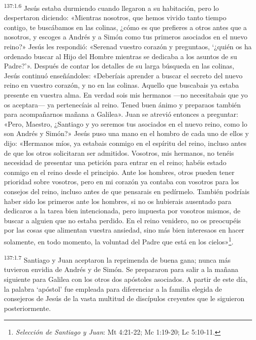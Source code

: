 \par
\textsuperscript{137:1.6} Jesús estaba durmiendo cuando llegaron a su habitación, pero lo despertaron diciendo: «Mientras nosotros, que hemos vivido tanto tiempo contigo, te buscábamos en las colinas, ¿cómo es que prefieres a otros antes que a nosotros, y escoges a Andrés y a Simón como tus primeros asociados en el nuevo reino?» Jesús les respondió: «Serenad vuestro corazón y preguntaos, `¿quién os ha ordenado buscar al Hijo del Hombre mientras se dedicaba a los asuntos de su Padre?'». Después de contar los detalles de su larga búsqueda en las colinas, Jesús continuó enseñándoles: «Deberíais aprender a buscar el secreto del nuevo reino en vuestro corazón, y no en las colinas. Aquello que buscabais ya estaba presente en vuestra alma. En verdad sois mis hermanos ---no necesitabais que yo os aceptara--- ya pertenecíais al reino. Tened buen ánimo y preparaos también para acompañarnos mañana a Galilea». Juan se atrevió entonces a preguntar: «Pero, Maestro, ¿Santiago y yo seremos tus asociados en el nuevo reino, como lo son Andrés y Simón?» Jesús puso una mano en el hombro de cada uno de ellos y dijo: «Hermanos míos, ya estabais conmigo en el espíritu del reino, incluso antes de que los otros solicitaran ser admitidos. Vosotros, mis hermanos, no tenéis necesidad de presentar una petición para entrar en el reino; habéis estado conmigo en el reino desde el principio. Ante los hombres, otros pueden tener prioridad sobre vosotros, pero en mi corazón ya contaba con vosotros para los consejos del reino, incluso antes de que pensarais en pedírmelo. También podríais haber sido los primeros ante los hombres, si no os hubierais ausentado para dedicaros a la tarea bien intencionada, pero impuesta por vosotros mismos, de buscar a alguien que no estaba perdido. En el reino venidero, no os preocupéis por las cosas que alimentan vuestra ansiedad, sino más bien interesaos en hacer solamente, en todo momento, la voluntad del Padre que está en los cielos»\footnote{\textit{Selección de Santiago y Juan}: Mt 4:21-22; Mc 1:19-20; Lc 5:10-11.}.

\par
\textsuperscript{137:1.7} Santiago y Juan aceptaron la reprimenda de buena gana; nunca más tuvieron envidia de Andrés y de Simón. Se prepararon para salir a la mañana siguiente para Galilea con los otros dos apóstoles asociados. A partir de este día, la palabra `apóstol' fue empleada para diferenciar a la familia elegida de consejeros de Jesús de la vasta multitud de discípulos creyentes que le siguieron posteriormente.

